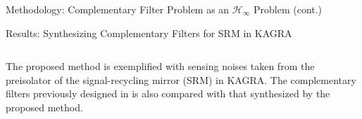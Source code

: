 \documentclass{beamer}
\begin{document}
\begin{frame}[t]
\begin{columns}[t]
\begin{column}{0.32\linewidth}
\begin{block}{Methodology: Complementary Filter Problem as an $\mathcal{H}_\infty$ Problem (cont.)}
%			
%			
			\end{block}
			
			\begin{block}{Results: Synthesizing Complementary Filters for SRM in KAGRA}
				\begin{columns}[t, onlytextwidth]
					\begin{column}{0.55\textwidth}
						The proposed method is exemplified with sensing noises taken from the preisolator of the signal-recycling mirror (SRM) in KAGRA.
						The complementary filters previously designed in \cite{Sekiguchi:2016bmv,vanHeijningen:2018cpc} is also compared with that synthesized by the proposed method.
						

\end{column}
\end{columns}
\end{block}
\end{column}
\end{columns}
\end{frame}
\end{document}
